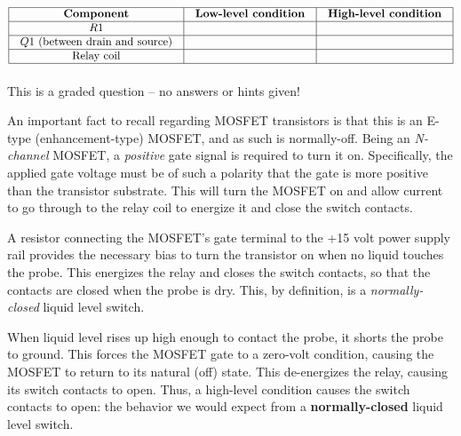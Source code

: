 $$\vbox{\offinterlineskip
\halign{\strut
\vrule \quad\hfil # \ \hfil & 
\vrule \quad\hfil # \ \hfil & 
\vrule \quad\hfil # \ \hfil \vrule \cr
\noalign{\hrule}
%
{\bf Component} & {\bf Low-level condition} & {\bf High-level condition} \cr
%
\noalign{\hrule}
%
$R1$ &  &  \cr
%
\noalign{\hrule}
%
$Q1$ (between drain and source) &  &  \cr
%
\noalign{\hrule}
%
Relay coil &  &  \cr
%
\noalign{\hrule}
} %
}$$ %


\vfil 

\eject






This is a graded question -- no answers or hints given!







An important fact to recall regarding MOSFET transistors is that this is an E-type (enhancement-type) MOSFET, and as such is normally-off.  Being an {\it N-channel} MOSFET, a {\it positive} gate signal is required to turn it on.  Specifically, the applied gate voltage must be of such a polarity that the gate is more positive than the transistor substrate.  This will turn the MOSFET on and allow current to go through to the relay coil to energize it and close the switch contacts.

\vskip 10pt

A resistor connecting the MOSFET's gate terminal to the +15 volt power supply rail provides the necessary bias to turn the transistor on when no liquid touches the probe.  This energizes the relay and closes the switch contacts, so that the contacts are closed when the probe is dry.  This, by definition, is a {\it normally-closed} liquid level switch.

\vskip 10pt

When liquid level rises up high enough to contact the probe, it shorts the probe to ground.  This forces the MOSFET gate to a zero-volt condition, causing the MOSFET to return to its natural (off) state.  This de-energizes the relay, causing its switch contacts to open.  Thus, a high-level condition causes the switch contacts to open: the behavior we would expect from a {\bf normally-closed} liquid level switch.

\vskip 10pt

